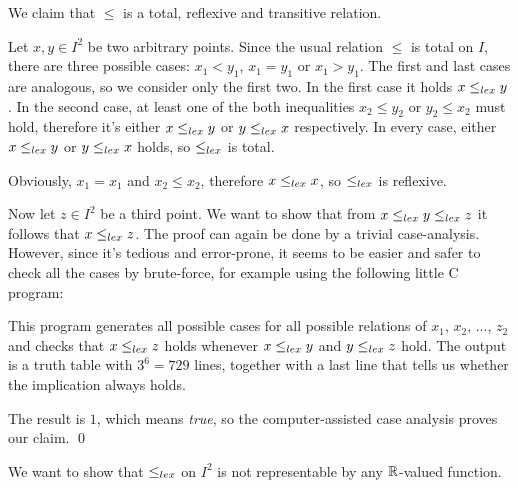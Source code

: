 \documentclass{scrartcl}
\begin{document}
 We claim that $\leq$ is a total, reflexive and transitive
relation.

 Let $x, y\in I^2$ be two arbitrary points.
Since the usual relation $\leq$ is total on $I$, there are three possible 
cases: $x_1 < y_1$, $x_1 = y_1$ or $x_1 > y_1$. The first and last
cases are analogous, so we consider only the first two.
In the first case it holds $x \leq_{lex} y$. 
In the second case, at least one of the both inequalities 
$x_2 \leq y_2$ or $y_2 \leq x_2$ must hold, therefore
it's either $x\leq_{lex} y$ or $y\leq_{lex} x$ respectively. 
In every case, either $x\leq_{lex} y$ or $y\leq_{lex} x$ holds, so $\leq_{lex}$ is total.

Obviously, $x_1 = x_1$ and $x_2 \leq x_2$, therefore $x\leq_{lex} x$, so $\leq_{lex}$ is
reflexive. 

Now let $z\in I^2$ be a third point. 
We want to show that from $x \leq_{lex} y \leq_{lex} z$ it follows that $x \leq_{lex} z$.
The proof can again be done by a trivial case-analysis.
However, since it's tedious and error-prone, it seems to be easier and 
safer to check all the cases by brute-force, for example using the
following little C program:

This program generates all possible cases for all possible relations of
$x_1$, $x_2$, ..., $z_2$ and checks that $x \leq_{lex} z$ holds whenever 
$x\leq_{lex} y$ and $y\leq_{lex} z$ hold. 
The output is a truth table with $3^6 = 729$ lines, together with a last
line that tells us whether the implication always holds. 

The result is $1$, which means \emph{true}, so the computer-assisted 
case analysis proves our claim. \hfill \qed 

\vspace{1.5em}

 We want to show that $\leq_{lex}$ on $I^2$ is not
representable by any $\mathbb{R}$-valued function.
\end{document}
